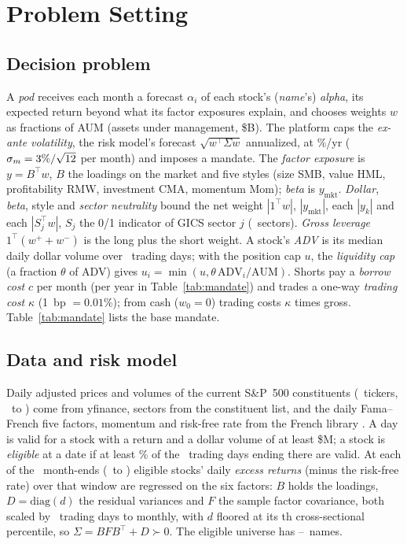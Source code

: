 \documentclass[conference]{IEEEtran}
\newcommand{\T}{^{\top}}
\begin{document}
\section{Problem Setting}
\label{sec:setting}

\subsection{Decision problem}
A \emph{pod} receives each month a forecast $\alpha_i$ of each stock's (\emph{name}'s) \emph{alpha}, its expected return beyond what its factor exposures explain, and chooses weights $w$ as fractions of AUM (assets under management, \$\AUMBillion B). The platform caps the \emph{ex-ante volatility}, the risk model's forecast $\sqrt{w\T\Sigma w}$ annualized, at \RiskBudgetPct\%/yr ($\sigma_m=3\%/\sqrt{12}$ per month) and imposes a mandate. The \emph{factor exposure} is $y=B\T w$, $B$ the loadings on the market and five styles (size SMB, value HML, profitability RMW, investment CMA, momentum Mom); \emph{beta} is $y_{\mathrm{mkt}}$. \emph{Dollar}, \emph{beta}, style and \emph{sector neutrality} bound the net weight $|1\T w|$, $|y_{\mathrm{mkt}}|$, each $|y_k|$ and each $|S_j\T w|$, $S_j$ the 0/1 indicator of GICS sector $j$ (\NSectors\ sectors). \emph{Gross leverage} $1\T(w^++w^-)$ is the long plus the short weight. A stock's \emph{ADV} is its median daily dollar volume over \AdvWindow\ trading days; with the position cap $u$, the \emph{liquidity cap} (a fraction $\theta$ of ADV) gives $u_i=\min(u,\theta\,\mathrm{ADV}_i/\mathrm{AUM})$. Shorts pay a \emph{borrow cost} $c$ per month (per year in Table~\ref{tab:mandate}) and trades a one-way \emph{trading cost} $\kappa$ (1~bp $=0.01\%$); from cash ($w_0=0$) trading costs $\kappa$ times gross. Table~\ref{tab:mandate} lists the base mandate.

\subsection{Data and risk model}
Daily adjusted prices and volumes of the current S\&P~500 constituents (\PanelTickers\ tickers, \PanelStart\ to \PanelEnd) come from yfinance, sectors from the constituent list, and the daily Fama--French five factors, momentum and risk-free rate from the French library \cite{fama2015five,french_data_library,yfinance}. A day is valid for a stock with a return and a dollar volume of at least \$\ValidDollarVolumeM M; a stock is \emph{eligible} at a date if at least \ValidPct\% of the \RiskWindow\ trading days ending there are valid. At each of the \RiskMonthEnds\ month-ends (\RiskFirst\ to \RiskLast) eligible stocks' daily \emph{excess returns} (minus the risk-free rate) over that window are regressed on the six factors: $B$ holds the loadings, $D=\mathrm{diag}(d)$ the residual variances and $F$ the sample factor covariance, both scaled by \DaysPerMonth\ trading days to monthly, with $d$ floored at its \FloorPct th cross-sectional percentile, so $\Sigma=BFB\T+D\succ0$. The eligible universe has \UnivMin--\UnivMax\ names.
\end{document}
